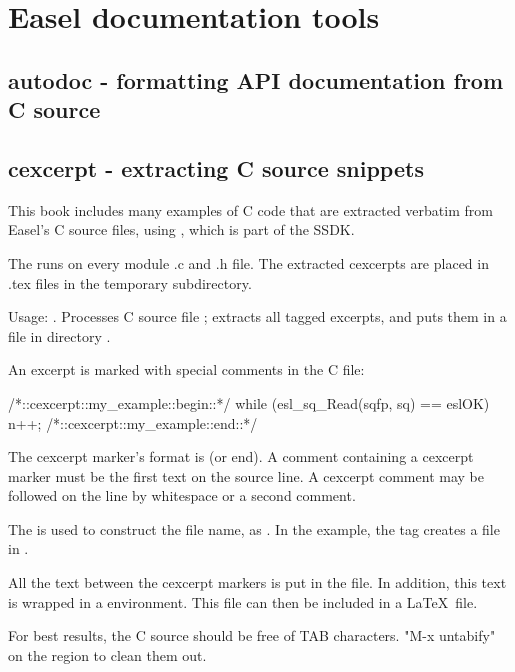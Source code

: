 \section{Easel documentation tools}

\subsection{autodoc - formatting API documentation from C source}


\subsection{cexcerpt - extracting C source snippets}

This book includes many examples of C code that are extracted verbatim
from Easel's C source files, using , which is part of
the SSDK.

The  runs  on every
module .c and .h file. The extracted cexcerpts are placed in .tex
files in the temporary  subdirectory.

Usage: . Processes C source file
; extracts all tagged excerpts, and puts them in a file
in directory .

An excerpt is marked with special comments in the C file:
\begin{cchunk}
/*::cexcerpt::my_example::begin::*/
   while (esl_sq_Read(sqfp, sq) == eslOK)
     { n++; }
/*::cexcerpt::my_example::end::*/
\end{cchunk}

The cexcerpt marker's format is  (or
end). A comment containing a cexcerpt marker must be the first text on
the source line. A cexcerpt comment may be followed on the line by
whitespace or a second comment.

The  is used to construct the file name, as
.  In the example, the tag  creates
a file  in .

All the text between the cexcerpt markers is put in the file.  In
addition, this text is wrapped in a  environment.  This
file can then be included in a \LaTeX\ file.

For best results, the C source should be free of TAB characters.
"M-x untabify" on the region to clean them out.


